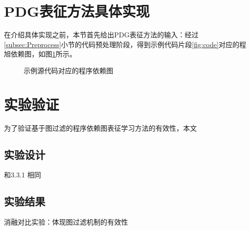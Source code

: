 \section{PDG表征方法具体实现}
\label{sec:PDGachieve}
在介绍具体实现之前，本节首先给出PDG表征方法的输入：经过\ref{subsec:Preprocess}小节的代码预处理阶段，得到示例代码片段\ref{fig:code}对应的程旭依赖图，如图\ref{fig:pdgcode}所示。
\begin{figure}[htbp]
  \centering  %
  \caption{示例源代码对应的程序依赖图}    %
  \label{fig:pdgcode}    %
\end{figure}


\section{实验验证}
\label{sec:PDGExperiment}
为了验证基于图过滤的程序依赖图表征学习方法的有效性，本文
\subsection{实验设计}
\label{sec:PDGDesign}
和3.3.1 相同
\subsection{实验结果}
\label{subsec:PDGResult}
消融对比实验：体现图过滤机制的有效性

